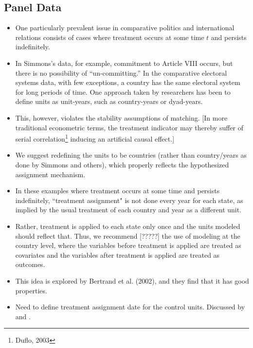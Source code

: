 \documentclass[11pt,titlepage]{article}
\begin{document}
\subsection{Panel Data}
\begin{itemize}
\item One particularly prevalent issue
  in comparative politics and international relations consists of
  cases where treatment occurs at some time $t$ and persists
  indefinitely.  
\item In Simmons's data, for example, commitment to Article VIII occurs,
  but there is no possibility of ``un-committing.''  In the
  comparative electoral systems data, with few exceptions, a country
  has the same electoral system for long periods of time.  One
  approach taken by researchers has been to define units as
  unit-years, such as country-years or dyad-years.  
\item This, however, violates the
  stability assumptions of matching. 
  [In more traditional econometric terms, the treatment indicator may
  thereby suffer of serial
  correlation\footnote{Duflo, 2003} inducing an artificial causal
  effect.] 
\item We suggest redefining the units to be countries (rather than country/years as done by Simmons and others),
which properly reflects the hypothesized assignment mechanism.  
\item In these examples where treatment occurs at some time
and persists indefinitely, ``treatment assignment" is not done every year for each state, as implied by the usual
treatment of each country and year as a different unit.  
\item Rather, treatment is applied to each state only once and the units modeled should reflect that.  Thus, we recommend [?????] the use of modeling at the country level, 
where
the variables before treatment is applied are treated as covariates and the variables after treatment is applied are treated as outcomes.  
\item This idea is explored by Bertrand et al. (2002), and they find that it has good properties. 
\item Need to define treatment assignment date for the control units.  Discussed by \cite{Rubin91} and \cite{Sianesi04}.
\end{itemize} 
\end{document}
